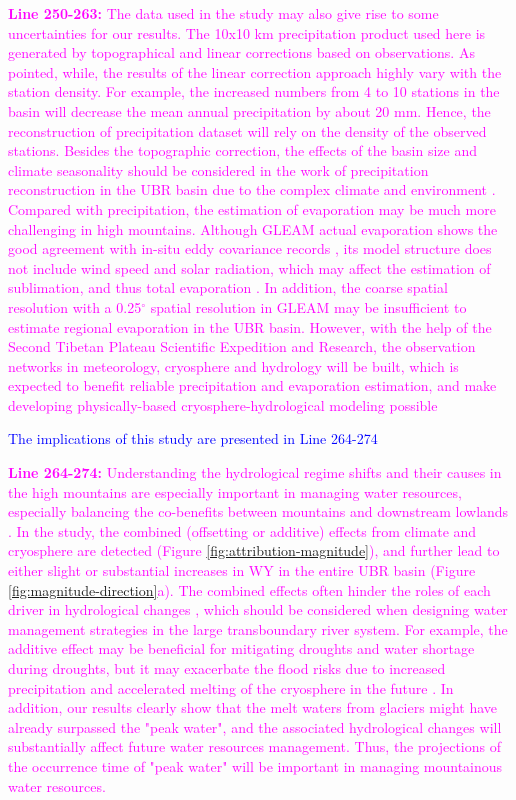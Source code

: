 \documentclass[11pt]{article}
\newcounter{reviewer}
\newcounter{point}[reviewer]
\newcommand{\nextreply}[1]{\bigskip \textcolor{blue}{\noindent #1}}
\newcommand{\revised}[3][2]{\bigskip \textcolor{magenta}{\noindent \textbf{Line #2:} #3}}
\begin{document}
\revised{250-263}{The data used in the study may also give rise to some uncertainties for our results. 
The 10x10 km precipitation product used here is generated by topographical and linear corrections based on observations. As \citet{sun2020precipitation} pointed, while, the results of the linear correction approach highly vary with the station density. For example, the increased numbers from 4 to 10 stations in the basin will decrease the mean annual precipitation by about 20 mm. Hence, the reconstruction of precipitation dataset will rely on the density of the observed stations. 
Besides the topographic correction, the effects of the basin size and climate seasonality should be considered in the work of precipitation reconstruction in the UBR basin due to the complex climate and environment \citep{sun2019contrasting}. 
Compared with precipitation, the estimation of evaporation may be much more challenging in high mountains. Although GLEAM actual evaporation shows the good agreement with in-situ eddy covariance records \citep{yang2017multi}, its model structure does not include wind speed and solar radiation, which may affect the estimation of sublimation, and thus total evaporation \citep{li2019evapotranspiration}. 
In addition, the coarse spatial resolution with a 0.25$^{\circ}$ spatial resolution in GLEAM may be insufficient to estimate regional evaporation in the UBR basin. 
However, with the help of the Second Tibetan Plateau Scientific Expedition and Research, the observation networks in meteorology, cryosphere and hydrology will be built, which is expected to benefit reliable precipitation and evaporation estimation, and make developing physically-based cryosphere-hydrological modeling possible \citep{wang2022observing}}

\nextreply{The implications of this study are presented in Line 264-274}

\revised{264-274}{Understanding the hydrological regime shifts and their causes in the high mountains are especially important in managing water resources, especially balancing the co-benefits between mountains and downstream lowlands \citep{viviroli2011climate}. 
In the study, the combined (offsetting or additive) effects from climate and cryosphere are detected (Figure \ref{fig:attribution-magnitude}), and further lead to either slight or substantial increases in WY in the entire UBR basin (Figure \ref{fig:magnitude-direction}a). 
The combined effects often hinder the roles of each driver in hydrological changes \citep{wei2018,zhang2021deforestation}, which should be considered when designing water management strategies in the large transboundary river system.
For example, the additive effect may be beneficial for mitigating droughts and water shortage during droughts, but it may exacerbate the flood risks due to increased precipitation and accelerated melting of the cryosphere in the future \citep{Immerzeel2013}.
In addition, our results clearly show that the melt waters from glaciers might have already surpassed the "peak water", and the associated hydrological changes will substantially affect future water resources management. Thus, the projections of the occurrence time of "peak water" will be important in managing mountainous water resources.}
\end{document}
